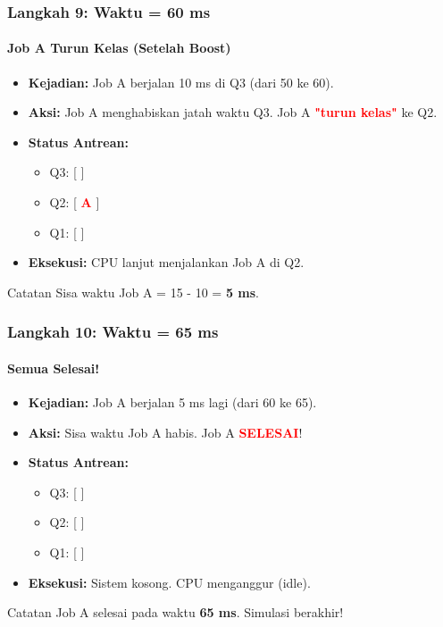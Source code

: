 \documentclass[t,aspectratio=169,xcolor=dvipsnames]{beamer}
\newcommand{\tem}[1]{\textbf{\textcolor{red}{#1}}}
\begin{document}
\begin{frame}
    \frametitle{Langkah 9: Waktu = 60 ms}
    \framesubtitle{Job A Turun Kelas (Setelah Boost)}
    \small
    \begin{itemize}
        \item \textbf{Kejadian:} Job A berjalan 10 ms di Q3 (dari 50 ke 60).
        \item \textbf{Aksi:} Job A menghabiskan jatah waktu Q3. Job A \tem{"turun kelas"} ke Q2.
        \item \textbf{Status Antrean:}
        \begin{itemize}
            \item Q3: [ ]
            \item Q2: [ \tem{A} ]
            \item Q1: [ ]
        \end{itemize}
        \item \textbf{Eksekusi:} CPU lanjut menjalankan Job A di Q2.
    \end{itemize}
    \vspace{0.3cm}
    \begin{exampleblock}{Catatan}
        Sisa waktu Job A = 15 - 10 = \textbf{5 ms}.
    \end{exampleblock}
\end{frame}

\begin{frame}
    \frametitle{Langkah 10: Waktu = 65 ms}
    \framesubtitle{Semua Selesai!}
    \small
    \begin{itemize}
        \item \textbf{Kejadian:} Job A berjalan 5 ms lagi (dari 60 ke 65).
        \item \textbf{Aksi:} Sisa waktu Job A habis. Job A \tem{SELESAI}!
        \item \textbf{Status Antrean:}
        \begin{itemize}
            \item Q3: [ ]
            \item Q2: [ ]
            \item Q1: [ ]
        \end{itemize}
        \item \textbf{Eksekusi:} Sistem kosong. CPU menganggur (idle).
    \end{itemize}
    \vspace{0.3cm}
    \begin{exampleblock}{Catatan}
        Job A selesai pada waktu \textbf{65 ms}. Simulasi berakhir!
    \end{exampleblock}
\end{frame}
\end{document}
